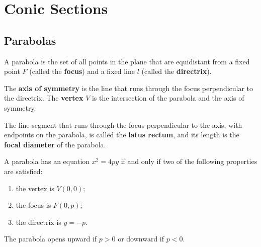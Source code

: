 
\chapter{Conic Sections}

\section{Parabolas}


\begin{definition}

A parabola is the set of all points in the plane that are equidistant from a fixed point $F$ (called the \textbf{focus}) and a fixed line $l$ (called the \textbf{directrix}).

The \textbf{axis of symmetry} is the line that runs through the focus perpendicular to the directrix. The \textbf{vertex} $V$ is the intersection of the parabola and the axis of symmetry.


The line segment that runs through the focus perpendicular to the axis, with endpoints on the parabola, is called the \textbf{latus rectum}, and its length is the \textbf{focal diameter} of the parabola.

\end{definition}



  \begin{theorem}
  A parabola has an equation $x^2=4py$ if and only if two of the following properties are satisfied:
  \begin{enumerate}
      \item the vertex is $V(0, 0)$;
      \item the focus is $F(0, p)$;
      \item the directrix is $y=-p$.
  \end{enumerate}
  
  The parabola opens upward if $p>0$ or downward if $p<0$.
  \end{theorem}
  
